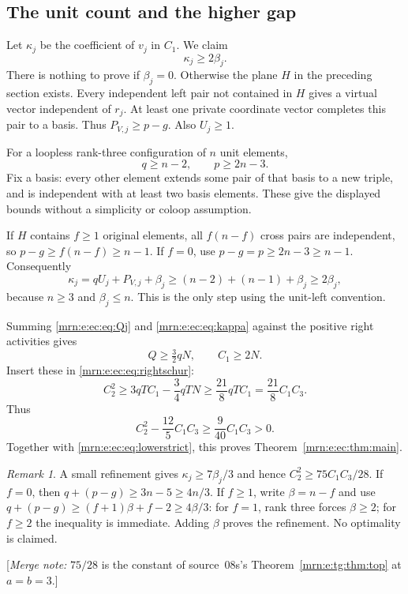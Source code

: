 \documentclass[11pt,a4paper]{article}
\theoremstyle{remark}\newtheorem{remark}[theorem]{Remark}
\newcommand{\mnote}[1]{[\textit{Merge note:} #1]}
\begin{document}
\subsection{The unit count and the higher gap}
Let $\kappa_j$ be the coefficient of $v_j$ in $C_1$. We claim
\begin{equation}\label{mrn:e:ec:eq:kappa}
 \kappa_j\ge2\beta_j.
\end{equation}
There is nothing to prove if $\beta_j=0$. Otherwise the plane $H$ in the preceding section exists. Every independent left pair not contained in $H$ gives a virtual vector independent of $r_j$. At least one private coordinate vector completes this pair to a basis. Thus $P_{V,j}\ge p-g$. Also $U_j\ge1$.

For a loopless rank-three configuration of $n$ unit elements,
\[
 q\ge n-2,\qquad p\ge2n-3.
\]
Fix a basis: every other element extends some pair of that basis to a new triple, and is independent with at least two basis elements. These give the displayed bounds without a simplicity or coloop assumption.

If $H$ contains $f\ge1$ original elements, all $f(n-f)$ cross pairs are independent, so
$p-g\ge f(n-f)\ge n-1$. If $f=0$, use $p-g=p\ge2n-3\ge n-1$. Consequently
\[
 \kappa_j=qU_j+P_{V,j}+\beta_j
 \ge(n-2)+(n-1)+\beta_j\ge2\beta_j,
\]
because $n\ge3$ and $\beta_j\le n$. This is the only step using the unit-left convention.

Summing \eqref{mrn:e:ec:eq:Qj} and \eqref{mrn:e:ec:eq:kappa} against the positive right activities gives
\[
 Q\ge\tfrac32qN,\qquad C_1\ge2N.
\]
Insert these in \eqref{mrn:e:ec:eq:rightschur}:
\[
 C_2^2\ge3qTC_1-\frac34qTN
       \ge\frac{21}{8}qTC_1=\frac{21}{8}C_1C_3.
\]
Thus
\begin{equation}\label{mrn:e:ec:eq:upperstrict}
 C_2^2-\frac{12}{5}C_1C_3\ge\frac9{40}C_1C_3>0.
\end{equation}
Together with \eqref{mrn:e:ec:eq:lowerstrict}, this proves Theorem~\ref{mrn:e:ec:thm:main}.

\begin{remark}
A small refinement gives $\kappa_j\ge7\beta_j/3$ and hence
$C_2^2\ge75C_1C_3/28$. If $f=0$, then
$q+(p-g)\ge3n-5\ge4n/3$. If $f\ge1$, write $\beta=n-f$ and use
$q+(p-g)\ge(f+1)\beta+f-2\ge4\beta/3$:
for $f=1$, rank three forces $\beta\ge2$; for $f\ge2$ the inequality is immediate.
Adding $\beta$ proves the refinement. No optimality is claimed.
\end{remark}
\mnote{$75/28$ is the constant of source~08s's Theorem~\ref{mrn:e:tg:thm:top} at $a=b=3$.}
\end{document}
